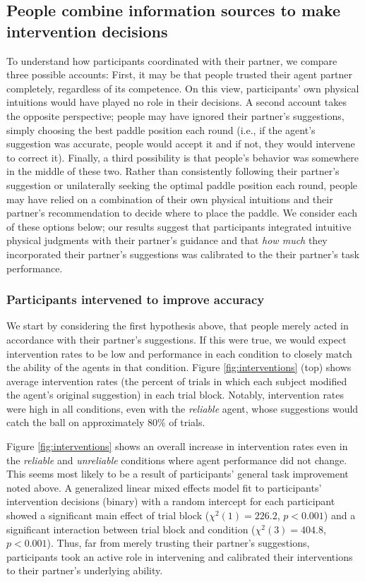 \documentclass[10pt,letterpaper]{article}
\begin{document}
\subsection{People combine information sources to make intervention decisions}

To understand how participants coordinated with their partner, we compare three possible accounts: First, it may be that people trusted their agent partner completely, regardless of its competence. On this view, participants' own physical intuitions would have played no role in their decisions. A second account takes the opposite perspective; people may have ignored their partner's suggestions, simply choosing the best paddle position each round (i.e., if the agent's suggestion was accurate, people would accept it and if not, they would intervene to correct it). Finally, a third possibility is that people's behavior was somewhere in the middle of these two. Rather than consistently following their partner's suggestion or unilaterally seeking the optimal paddle position each round, people may have relied on a combination of their own physical intuitions and their partner's recommendation to decide where to place the paddle. We consider each of these options below; our results suggest that participants integrated intuitive physical judgments with their partner's guidance and that \textit{how much} they incorporated their partner's suggestions was calibrated to the their partner's task performance.


\subsubsection{Participants intervened to improve accuracy} 

We start by considering the first hypothesis above, that people merely acted in accordance with their partner's suggestions. If this were true, we would expect intervention rates to be low and performance in each condition to closely match the ability of the agents in that condition. Figure \ref{fig:interventions} (top) shows average intervention rates (the percent of trials in which each subject modified the agent's original suggestion) in each trial block. Notably, intervention rates were high in all conditions, even with the \textit{reliable} agent, whose suggestions would catch the ball on approximately 80\% of trials. 

Figure \ref{fig:interventions} shows an overall increase in intervention rates even in the \textit{reliable} and \textit{unreliable} conditions where agent performance did not change. This seems most likely to be a result of participants' general task improvement noted above. A generalized linear mixed effects model fit to participants' intervention decisions (binary) with a random intercept for each participant showed a significant main effect of trial block ($\chi^2(1) = 226.2$, $p < 0.001$) and a significant interaction between trial block and condition ($\chi^2(3) = 404.8$, $p < 0.001$). Thus, far from merely trusting their partner's suggestions, participants took an active role in intervening and calibrated their interventions to their partner's underlying ability.
\end{document}
